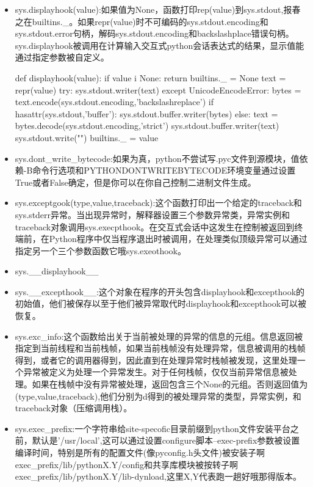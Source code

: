 \begin{itemize}
\item sys.displayhook(value):如果值为None，函数打印rep(value)到sys.stdout,报春之在builtins.\_。如果repr(value)时不可编码的sys.stdout.encoding和sys.stdout.error句柄，解码sys.stdout.encoding和backslashplace错误句柄。
sys.displayhook被调用在计算输入交互式python会话表达式的结果，显示值能通过指定参数被自定义。
\begin{python}
def displayhook(value):
    if value i None:
        return 
    builtins._ = None
    text = repr(value)
    try:
        sys.stdout.writer(text)
    except UnicodeEncodeError:
        bytes = text.encode(sys.stdout.encoding,'backslashreplace')
        if hasattr(sys.stdout,'buffer'):
            sys.stdout.buffer.writer(bytes)
        else:
            text = bytes.decode(sys.stdout.encoding,'strict')
            sys.stdout.buffer.writer(text)
    sys.stdout.write("\n")
    builtins._ = value
\end{python}
\item sys.dont\_write\_bytecode:如果为真，python不尝试写.pyc文件到源模块，值依赖-B命令行选项和PYTHONDONTWRITEBYTECODE环境变量通过设置True或者False确定，但是你可以在你自己控制二进制文件生成。
\item sys.exceptgook(type,value,traceback):这个函数打印出一个给定的traceback和sys.stderr异常。当出现异常时，解释器设置三个参数异常类，异常实例和traceback对象调用sys.execpthook。在交互式会话中这发生在控制被返回到终端前，在Python程序中仅当程序退出时被调用，在处理类似顶级异常可以通过指定另一个三个参数函数它哦sys.exeothook。
\item sys.\_\_displayhook\_\_
\item sys.\_\_excepthook\_\_:这个对象在程序的开头包含displayhook和excepthook的初始值，他们被保存以至于他们被异常取代时displayhook和excepthook可以被恢复。
\item sys.exc\_info:这个函数给出关于当前被处理的异常的信息的元组。信息返回被指定到当前线程和当前栈帧，如果当前栈帧没有处理异常，信息被调用的栈帧得到，或者它的调用器得到，因此直到在处理异常时栈帧被发现，这里处理一个异常被定义为处理一个异常发生。对于任何栈帧，仅仅当前异常信息被处理。如果在栈帧中没有异常被处理，返回包含三个None的元组。否则返回值为(type,value,traceback),他们分别为d得到的被处理异常的类型，异常实例，和traceback对象（压缩调用栈）。
\item sys.exec\_prefix:一个字符串给site-specofic目录前缀到python文件安装平台之前，默认是'/usr/local',这可以通过设置configure脚本--exec-prefix参数被设置编译时间，特别是所有的配置文件(像pyconfig.h头文件)被安装子啊exec\_prefix/lib/pythonX.Y/config和共享库模块被按转子啊exec\_prefix/lib/pythonX.Y/lib-dynload,这里X,Y代表跑一趟好哦那得版本。

\end{itemize}
